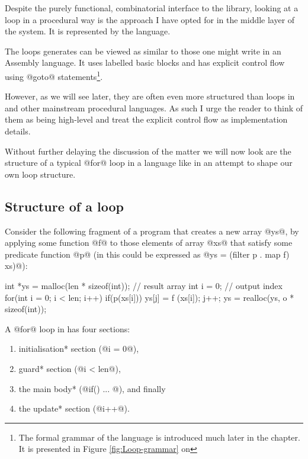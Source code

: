 \documentclass[preamble.tex]{subfiles}
\begin{document}
Despite the purely functional, combinatorial interface to the library, looking at a loop in a procedural way is the approach I have opted for in the middle layer of the system. It is represented by the \Loop language.

The loops \LiveFusion generates can be viewed as similar to those one might write in an Assembly language. It uses labelled basic blocks and has explicit control flow using @goto@ statements\footnote{The formal grammar of the \Loop language is introduced much later in the chapter. It is presented in Figure \ref{fig:Loop-grammar} on \pageref{fig:Loop-grammar}}.

However, as we will see later, they are often even more structured than loops in \C and other mainstream procedural languages. As such I urge the reader to think of them as being high-level and treat the explicit control flow as implementation details.


Without further delaying the discussion of the matter we will now look are the structure of a typical @for@ loop in a language like \C in an attempt to shape our own loop structure.


\subsection{Structure of a  loop}

Consider the following fragment of a \C program that creates a new array @ys@, by applying some function @f@ to those elements of array @xs@ that satisfy some predicate function @p@ (in \Haskell this could be expressed as @ys = (filter p . map f) xs)@):

\begin{ccode}[numbers=left]
int *ys = malloc(len * sizeof(int)); // result array
int i = 0;                          // output index
for(int i = 0; i < len; i++) {
    if(p(xs[i])) {
        ys[j] = f (xs[i]);
        j++;
    }
}
ys = realloc(ys, o * sizeof(int));
\end{ccode}

A @for@ loop in \C has four sections:

\begin{enumerate}
\halfspacing
\item \*initialisation* section (@i = 0@),
\item \*guard* section (@i < len@),
\item the main \*body* (@if(){ $...$ }@), and finally
\item the \*update* section (@i++@).
\end{enumerate}
\end{document}
